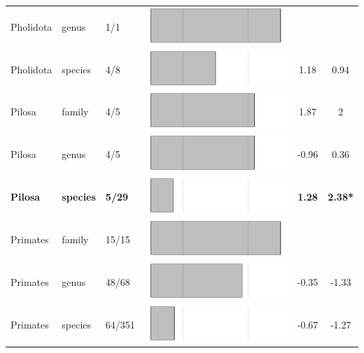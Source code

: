 \begin{longtable}{lL{1.8cm}C{2cm}lcc}
  Pholidota & genus & 1/1 & \includegraphics[width=0.20\linewidth, height=0.05\linewidth]{Supplementaries/Figures/MissingMammals/Results_1c/Table_figures/bar59.pdf} &   &   \\ 
  Pholidota & species & 4/8 & \includegraphics[width=0.20\linewidth, height=0.05\linewidth]{Supplementaries/Figures/MissingMammals/Results_1c/Table_figures/bar60.pdf} & 1.18 & 0.94 \\ 
  Pilosa & family & 4/5 & \includegraphics[width=0.20\linewidth, height=0.05\linewidth]{Supplementaries/Figures/MissingMammals/Results_1c/Table_figures/bar61.pdf} & 1.87 & 2 \\ 
  Pilosa & genus & 4/5 & \includegraphics[width=0.20\linewidth, height=0.05\linewidth]{Supplementaries/Figures/MissingMammals/Results_1c/Table_figures/bar62.pdf} & -0.96 & 0.36 \\ 
  \textbf{Pilosa} & \textbf{species} & \textbf{5/29} & \includegraphics[width=0.20\linewidth, height=0.05\linewidth]{Supplementaries/Figures/MissingMammals/Results_1c/Table_figures/bar63.pdf} & \textbf{1.28} & \textbf{2.38*} \\ 
  Primates & family & 15/15 & \includegraphics[width=0.20\linewidth, height=0.05\linewidth]{Supplementaries/Figures/MissingMammals/Results_1c/Table_figures/bar64.pdf} &   &   \\ 
  Primates & genus & 48/68 & \includegraphics[width=0.20\linewidth, height=0.05\linewidth]{Supplementaries/Figures/MissingMammals/Results_1c/Table_figures/bar65.pdf} & -0.35 & -1.33 \\ 
  Primates & species & 64/351 & \includegraphics[width=0.20\linewidth, height=0.05\linewidth]{Supplementaries/Figures/MissingMammals/Results_1c/Table_figures/bar66.pdf} & -0.67 & -1.27 \\ 

\end{longtable}
